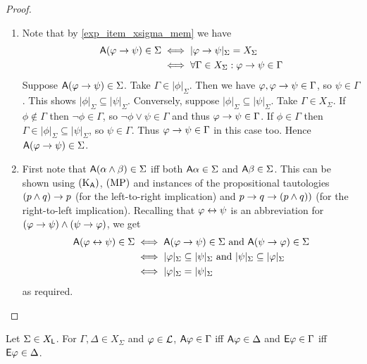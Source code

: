 \begin{proof}
\begin{enumerate}
    \item Note that by \cref{exp_item_xsigma_mem} we have
        \[
        \begin{aligned}
            \mathsf{A}(\varphi \to \psi) \in \Sigma
            &\iff |\varphi \to \psi|_\Sigma = X_\Sigma \\
            &\iff \forall \Gamma \in X_\Sigma: \varphi \to \psi \in
                \Gamma
        \end{aligned}
        \]
        Suppose $\mathsf{A}(\varphi \to \psi) \in \Sigma$. Take $\Gamma \in
        |\phi|_\Sigma$. Then we have $\varphi, \varphi \to \psi \in
        \Gamma$, so $\psi \in \Gamma$. This shows $|\phi|_\Sigma
        \subseteq |\psi|_\Sigma$.
        Conversely, suppose $|\phi|_\Sigma \subseteq |\psi|_\Sigma$.
        Take $\Gamma \in X_\Sigma$. If $\phi \notin \Gamma$ then
        $\neg\phi \in \Gamma$, so $\neg\phi \lor \psi \in \Gamma$ and
        thus $\varphi \to \psi \in \Gamma$. If $\phi \in \Gamma$
        then $\Gamma \in |\phi|_\Sigma \subseteq |\psi|_\Sigma$, so
        $\psi \in \Gamma$. Thus $\varphi \to \psi \in \Gamma$ in
        this case too. Hence $\mathsf{A}(\varphi \to \psi) \in \Sigma$.

   \item First note that $\mathsf{A}(\alpha \land \beta)
       \in \Sigma$ iff both $\mathsf{A}\alpha \in \Sigma$ and $\mathsf{A}\beta \in \Sigma$.
       This can be shown using $(\text{K}_{\mathsf{A}})$, $(\text{MP})$ and instances of the
       propositional tautologies $(p \land q) \to p$ (for the
       left-to-right implication) and $p \to q \to (p \land q))$
       (for the right-to-left implication).
        Recalling that $\varphi \leftrightarrow \psi$ is an abbreviation for $(\varphi
        \to \psi) \land (\psi \to \varphi)$, we get
        \[
        \begin{aligned}
            \mathsf{A}(\varphi \leftrightarrow \psi) \in \Sigma
            &\iff \mathsf{A}(\varphi \to \psi) \in \Sigma \text{ and }
                \mathsf{A}(\psi \to \varphi) \in \Sigma \\
            &\iff |\varphi|_\Sigma \subseteq |\psi|_\Sigma \text { and }
                |\psi|_\Sigma \subseteq |\varphi|_\Sigma \\
            & \iff |\varphi|_\Sigma = |\psi|_\Sigma
        \end{aligned}
        \]
        as required.
\end{enumerate}
\end{proof}

\begin{corollary}
\label{exp_cor_xsigma_agree_on_ae}
    Let $\Sigma \in X_{\mathsf{L}}$. For $\Gamma, \Delta \in X_\Sigma$ and $\varphi \in
    \mathcal{L}$, $\mathsf{A}\varphi \in \Gamma$ iff $\mathsf{A}\varphi \in \Delta$ and $\mathsf{E}\varphi \in \Gamma$
    iff $\mathsf{E}\varphi \in \Delta$.
\end{corollary}

